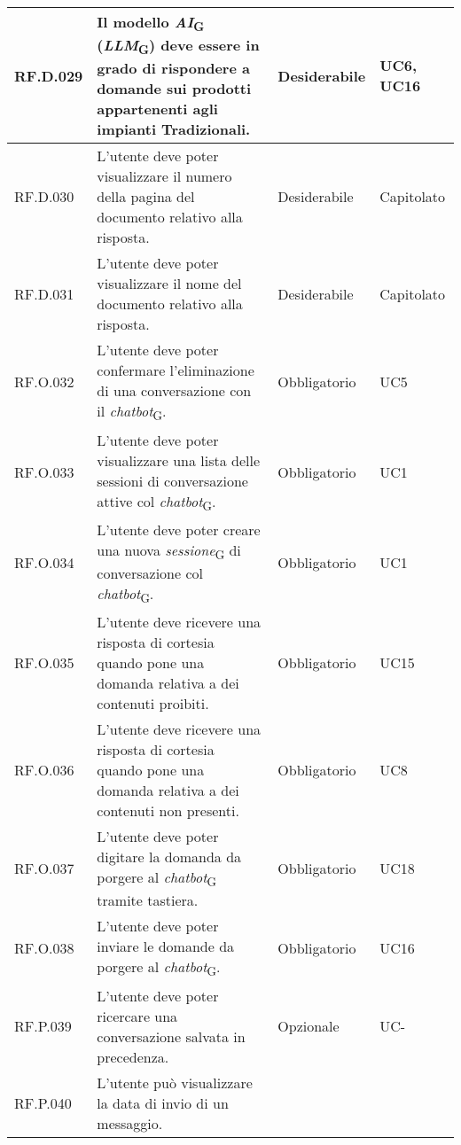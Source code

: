 \begin{table}[H]
\centering
    \begin{tabular}{|C{2.7cm}|L{7.2cm}|C{2.7cm}|C{2cm}|}
        \hline
        RF.D.029 & Il modello \textit{AI}\textsubscript{G} (\textit{LLM}\textsubscript{G}) deve essere in grado di rispondere a domande sui prodotti appartenenti agli impianti Tradizionali.
         & Desiderabile & UC6, UC16 \\
        \hline
        RF.D.030 & L’utente deve poter visualizzare il numero della pagina del documento relativo alla risposta.
         & Desiderabile & Capitolato \\
        \hline
        RF.D.031 & L’utente deve poter visualizzare il nome del documento relativo alla
        risposta.
         & Desiderabile & Capitolato \\
        \hline
        RF.O.032 & L’utente deve poter confermare l'eliminazione di una conversazione con il \textit{chatbot}\textsubscript{G}.
         & Obbligatorio & UC5 \\
        \hline
        RF.O.033 & L’utente deve poter visualizzare una lista delle
        sessioni di conversazione attive col \textit{chatbot}\textsubscript{G}.
         & Obbligatorio & UC1 \\
        \hline
        RF.O.034 & L’utente deve poter creare una nuova \textit{sessione}\textsubscript{G} di conversazione col \textit{chatbot}\textsubscript{G}.
         & Obbligatorio & UC1 \\
        \hline
        RF.O.035 & L’utente deve ricevere una risposta di cortesia quando pone una domanda relativa a dei contenuti proibiti.
         & Obbligatorio & UC15 \\
        \hline
        RF.O.036 & L’utente deve ricevere una risposta di cortesia quando pone una domanda relativa a dei contenuti non presenti.
         & Obbligatorio & UC8 \\
        \hline
        RF.O.037 & L’utente deve poter digitare la domanda da porgere al \textit{chatbot}\textsubscript{G} tramite tastiera.
         & Obbligatorio & UC18 \\
        \hline
        RF.O.038 & L’utente deve poter inviare le domande da porgere al \textit{chatbot}\textsubscript{G}.
         & Obbligatorio & UC16 \\
        \hline
        RF.P.039 & L’utente deve poter ricercare una conversazione salvata in precedenza.
         & Opzionale & UC- \\
        \hline
        RF.P.040 & L’utente può visualizzare la data di invio di un messaggio.

\end{tabular}
\end{table}

